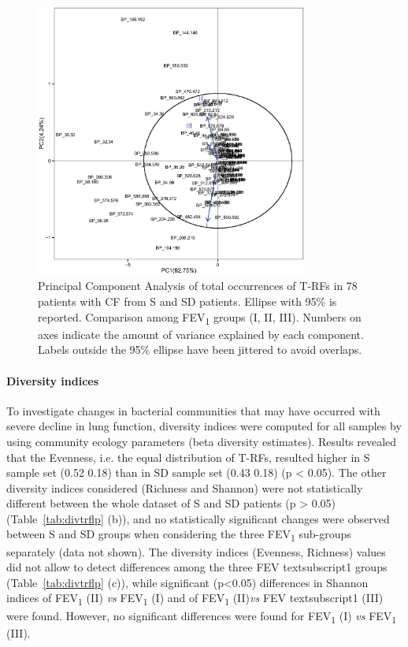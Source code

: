 \begin{figure}[!tb]
	\centering
	\includegraphics[width=0.8\textwidth]{./figures/Chapter_7/Figure_4_fev1_trf}
  	\caption{\label{fig:fig4fev1trf} Principal Component Analysis of total occurrences of T-RFs in 78 patients with CF from S and SD patients. Ellipse with 95\% is reported. Comparison among FEV\textsubscript{1} groups (I, II, III). Numbers on axes indicate the amount of variance explained by each component. Labels outside the 95\% ellipse have been jittered to avoid overlaps.}
\end{figure}%

\paragraph{Diversity indices} To investigate changes in bacterial communities that may have occurred with severe decline in lung function, diversity indices were computed for all samples by using community ecology parameters (beta diversity estimates). Results revealed that the Evenness, i.e. the equal distribution of T-RFs, resulted higher in S sample set (0.52 {\textpm} 0.18) than in SD sample set (0.43 {\textpm} 0.18) (p {\textless} 0.05). The other diversity indices considered (Richness and Shannon) were not statistically different between the whole dataset of S and SD patients (p {\textgreater} 0.05) (Table~\ref{tab:divtrflp} (b)), and no statistically significant changes were observed between S and SD groups when considering the three FEV\textsubscript{1} sub-groups separately (data not shown). The diversity indices (Evenness, Richness) values did not allow to detect differences among the three FEV textsubscript{1} groups (Table~\ref{tab:divtrflp} (c)), while significant (p{\textless}0.05) differences in Shannon indices of FEV\textsubscript{1} (II) \textit{vs} FEV\textsubscript{1} (I) and of FEV\textsubscript{1} (II)\textit{vs} FEV textsubscript{1} (III) were found. However, no significant differences were found for FEV\textsubscript{1} (I) \textit{vs} FEV\textsubscript{1} (III).\\

